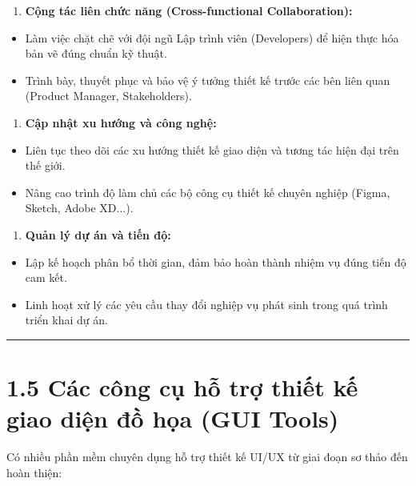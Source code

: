 \documentclass[11pt,a4paper,oneside]{report}
\begin{document}
\begin{enumerate}[leftmargin=1.5em]
\item \textbf{Cộng tác liên chức năng (Cross-functional Collaboration):}
\end{enumerate}
\begin{itemize}[leftmargin=1.5em]
\item Làm việc chặt chẽ với đội ngũ Lập trình viên (Developers) để hiện thực hóa bản vẽ đúng chuẩn kỹ thuật.
\item Trình bày, thuyết phục và bảo vệ ý tưởng thiết kế trước các bên liên quan (Product Manager, Stakeholders).
\end{itemize}
\begin{enumerate}[leftmargin=1.5em]
\item \textbf{Cập nhật xu hướng và công nghệ:}
\end{enumerate}
\begin{itemize}[leftmargin=1.5em]
\item Liên tục theo dõi các xu hướng thiết kế giao diện và tương tác hiện đại trên thế giới.
\item Nâng cao trình độ làm chủ các bộ công cụ thiết kế chuyên nghiệp (Figma, Sketch, Adobe XD...).
\end{itemize}
\begin{enumerate}[leftmargin=1.5em]
\item \textbf{Quản lý dự án và tiến độ:}
\end{enumerate}
\begin{itemize}[leftmargin=1.5em]
\item Lập kế hoạch phân bổ thời gian, đảm bảo hoàn thành nhiệm vụ đúng tiến độ cam kết.
\item Linh hoạt xử lý các yêu cầu thay đổi nghiệp vụ phát sinh trong quá trình triển khai dự án.
\end{itemize}

\bigskip\hrule\bigskip

\section{1.5 Các công cụ hỗ trợ thiết kế giao diện đồ họa (GUI Tools)}

Có nhiều phần mềm chuyên dụng hỗ trợ thiết kế UI/UX từ giai đoạn sơ thảo đến hoàn thiện:
\end{document}
